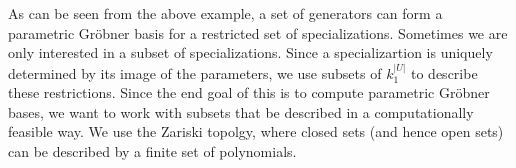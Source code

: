 






As can be seen from the above example, a set of generators can form a parametric Gröbner basis for a restricted set of specializations. Sometimes we are only interested in a subset of specializations. Since a specializartion is uniquely determined by its image of the parameters, we use subsets of $k_{1}^{|U|}$ to describe these restrictions. Since the end goal of this is to compute parametric Gröbner bases, we want to work with subsets that be described in a computationally feasible way. We use the Zariski topolgy, where closed sets (and hence open sets) can be described by a finite set of polynomials.

